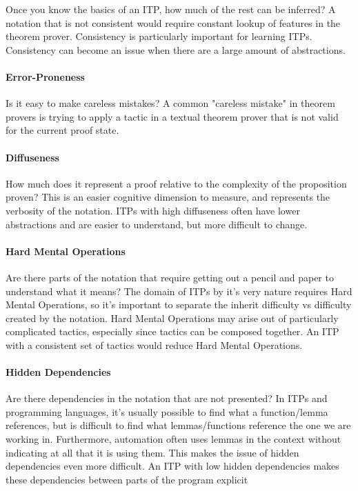 \documentclass[
]{article}
\begin{document}
Once you know the basics of an ITP, how much of the rest can be
inferred? A notation that is not consistent would require constant
lookup of features in the theorem prover. Consistency is particularly
important for learning ITPs. Consistency can become an issue when there
are a large amount of abstractions.

\hypertarget{error-proneness}{%
\paragraph{Error-Proneness}\label{error-proneness}}

Is it easy to make careless mistakes? A common "careless mistake" in
theorem provers is trying to apply a tactic in a textual theorem prover
that is not valid for the current proof state.

\hypertarget{diffuseness}{%
\paragraph{Diffuseness}\label{diffuseness}}

How much does it represent a proof relative to the complexity of the
proposition proven? This is an easier cognitive dimension to measure,
and represents the verbosity of the notation. ITPs with high diffuseness
often have lower abstractions and are easier to understand, but more
difficult to change.

\hypertarget{hard-mental-operations}{%
\paragraph{Hard Mental Operations}\label{hard-mental-operations}}

Are there parts of the notation that require getting out a pencil and
paper to understand what it means? The domain of ITPs by it's very
nature requires Hard Mental Operations, so it's important to separate
the inherit difficulty vs difficulty created by the notation. Hard
Mental Operations may arise out of particularly complicated tactics,
especially since tactics can be composed together. An ITP with a
consistent set of tactics would reduce Hard Mental Operations.

\hypertarget{hidden-dependencies}{%
\paragraph{Hidden Dependencies}\label{hidden-dependencies}}

Are there dependencies in the notation that are not presented? In ITPs
and programming languages, it's usually possible to find what a
function/lemma references, but is difficult to find what
lemmas/functions reference the one we are working in. Furthermore,
automation often uses lemmas in the context without indicating at all
that it is using them. This makes the issue of hidden dependencies even
more difficult. An ITP with low hidden dependencies makes these
dependencies between parts of the program explicit
\end{document}

